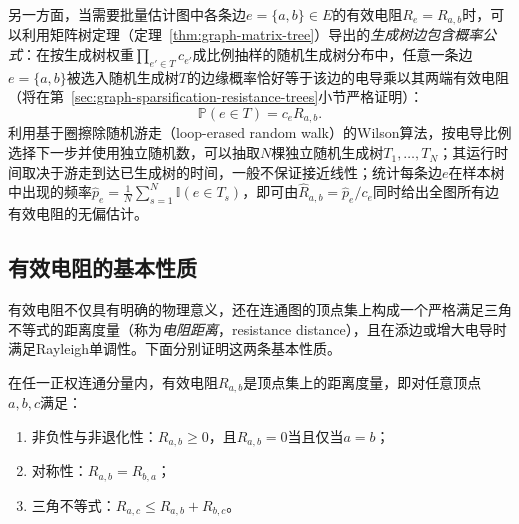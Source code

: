 另一方面，当需要批量估计图中各条边$e=\{a,b\}\in E$的有效电阻$R_e = R_{a,b}$时，可以利用矩阵树定理（定理~\ref{thm:graph-matrix-tree}）导出的\emph{生成树边包含概率公式}：在按生成树权重$\prod_{e'\in T}c_{e'}$成比例抽样的随机生成树分布中，任意一条边$e=\{a,b\}$被选入随机生成树$T$的边缘概率恰好等于该边的电导乘以其两端有效电阻（将在第~\ref{sec:graph-sparsification-resistance-trees}小节严格证明）：
\begin{equation}
  \mathbb P(e \in T) = c_e R_{a,b}.
  \label{eq:electrical-resistance-tree-probability}
\end{equation}
利用基于圈擦除随机游走（loop-erased random walk）的Wilson算法，按电导比例选择下一步并使用独立随机数，可以抽取$N$棵独立随机生成树$T_1,\ldots,T_N$；其运行时间取决于游走到达已生成树的时间，一般不保证接近线性；统计每条边$e$在样本树中出现的频率$\widehat p_e = \frac1N\sum_{s=1}^N \mathbb I(e\in T_s)$，即可由$\widehat R_{a,b} = \widehat p_e / c_e$同时给出全图所有边有效电阻的无偏估计。

\subsection{有效电阻的基本性质}
\label{sec:electrical-resistance-properties}

有效电阻不仅具有明确的物理意义，还在连通图的顶点集上构成一个严格满足三角不等式的距离度量（称为\emph{电阻距离}，resistance distance），且在添边或增大电导时满足Rayleigh单调性。下面分别证明这两条基本性质。

\begin{theorem}[有效电阻的度量性质]
\label{thm:electrical-resistance-metric}
在任一正权连通分量内，有效电阻$R_{a,b}$是顶点集上的距离度量，即对任意顶点$a,b,c$满足：
\begin{enumerate}
  \item 非负性与非退化性：$R_{a,b}\geq 0$，且$R_{a,b}=0$当且仅当$a=b$；
  \item 对称性：$R_{a,b} = R_{b,a}$；
  \item 三角不等式：$R_{a,c} \leq R_{a,b} + R_{b,c}$。
\end{enumerate}
\end{theorem}

